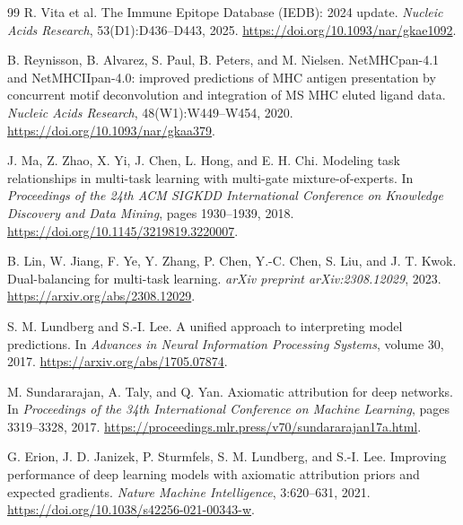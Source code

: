 \begingroup
\small
\begin{thebibliography}{99}
R. Vita et al.
\newblock The Immune Epitope Database (IEDB): 2024 update.
\newblock \emph{Nucleic Acids Research}, 53(D1):D436--D443, 2025.
\newblock \url{https://doi.org/10.1093/nar/gkae1092}.

B. Reynisson, B. Alvarez, S. Paul, B. Peters, and M. Nielsen.
\newblock NetMHCpan-4.1 and NetMHCIIpan-4.0: improved predictions of MHC antigen presentation by concurrent motif deconvolution and integration of MS MHC eluted ligand data.
\newblock \emph{Nucleic Acids Research}, 48(W1):W449--W454, 2020.
\newblock \url{https://doi.org/10.1093/nar/gkaa379}.

J. Ma, Z. Zhao, X. Yi, J. Chen, L. Hong, and E. H. Chi.
\newblock Modeling task relationships in multi-task learning with multi-gate mixture-of-experts.
\newblock In \emph{Proceedings of the 24th ACM SIGKDD International Conference on Knowledge Discovery and Data Mining}, pages 1930--1939, 2018.
\newblock \url{https://doi.org/10.1145/3219819.3220007}.

B. Lin, W. Jiang, F. Ye, Y. Zhang, P. Chen, Y.-C. Chen, S. Liu, and J. T. Kwok.
\newblock Dual-balancing for multi-task learning.
\newblock \emph{arXiv preprint arXiv:2308.12029}, 2023.
\newblock \url{https://arxiv.org/abs/2308.12029}.

S. M. Lundberg and S.-I. Lee.
\newblock A unified approach to interpreting model predictions.
\newblock In \emph{Advances in Neural Information Processing Systems}, volume 30, 2017.
\newblock \url{https://arxiv.org/abs/1705.07874}.

M. Sundararajan, A. Taly, and Q. Yan.
\newblock Axiomatic attribution for deep networks.
\newblock In \emph{Proceedings of the 34th International Conference on Machine Learning}, pages 3319--3328, 2017.
\newblock \url{https://proceedings.mlr.press/v70/sundararajan17a.html}.

G. Erion, J. D. Janizek, P. Sturmfels, S. M. Lundberg, and S.-I. Lee.
\newblock Improving performance of deep learning models with axiomatic attribution priors and expected gradients.
\newblock \emph{Nature Machine Intelligence}, 3:620--631, 2021.
\newblock \url{https://doi.org/10.1038/s42256-021-00343-w}.

\end{thebibliography}
\endgroup